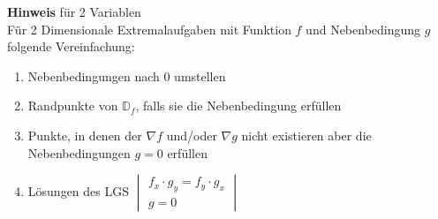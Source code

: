 \noindent\textbf{Hinweis} für 2 Variablen\\
Für 2 Dimensionale Extremalaufgaben mit Funktion $f$ und Nebenbedingung $g$ folgende Vereinfachung:
\begin{enumerate}[nosep]
		\item Nebenbedingungen nach $0$ umstellen
	\item Randpunkte von $\mathbb{D}_f$, falls sie die Nebenbedingung erfüllen
	\item Punkte, in denen der $\nabla f$ und/oder $\nabla g$ nicht existieren aber die Nebenbedingungen $g = 0$ erfüllen
	\item Lösungen des LGS $\begin{vmatrix}
		f_x \cdot g_y = f_y \cdot g_x \\
		g = 0
	\end{vmatrix}$
\end{enumerate}


